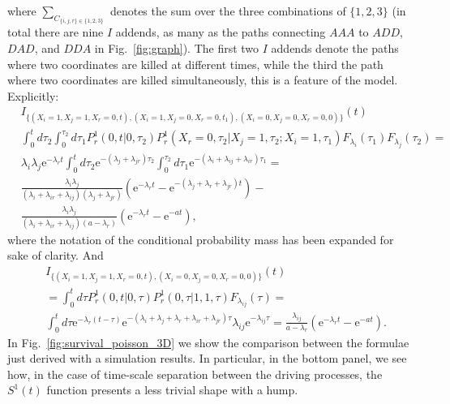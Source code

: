 \documentclass[a4paper,11pt]{amsart}
\theoremstyle{remark}
\newcommand{\ee}[1]{\mathrm{e}^{#1}}
\begin{document}
where $\sum_{C_{\{i,j,r\}\in\{1,2,3\}}}$ denotes the sum over the three combinations of $\{1,2,3\}$ (in total there are nine $I$ addends, as many as the paths connecting $AAA$ to $ADD$, $DAD$, and $DDA$ in Fig.~\ref{fig:graph}). The first two $I$ addends denote the paths where two coordinates are killed at different times, while the third the path where two coordinates are killed simultaneously, this is a feature of the model. Explicitly:
\begin{equation}
  \label{eq:G_2_1}
  \begin{aligned}
    &I_{\{(X_i=1,X_j=1,X_r=0,t),(X_i=1,X_j=0,X_r=0,t_1),(X_i=0,X_j=0,X_r=0,0)\}}(t)\\
    &\int_0^t d\tau_2 \int_0^{\tau_2}d\tau_1 P^1_{r}(0,t|0,\tau_2)P^1_{r}(X_r=0,\tau_2|X_j=1,\tau_2;X_i=1,\tau_1)F_{\lambda_i}(\tau_1)F_{\lambda_j}(\tau_2)=\\
    &\lambda_i\lambda_j\ee{-\lambda_r t}\int_0^t d\tau_2 \ee{-(\lambda_j+\lambda_{jr})\tau_2}\int_0^{\tau_2}d\tau_1\ee{-(\lambda_i+\lambda_{ij}+\lambda_{ir})\tau_1}=\\
    &\frac{\lambda_i\lambda_j}{(\lambda_i+\lambda_{ir}+\lambda_{ij})(\lambda_j+\lambda_{jr})}\left(\ee{-\lambda_r t}-\ee{-(\lambda_j+\lambda_r+\lambda_{jr})t}\right)-\\
    &\frac{\lambda_i\lambda_j}{(\lambda_i+\lambda_{ir}+\lambda_{ij})(a-\lambda_r)}\left(\ee{-\lambda_r t}-\ee{-at}\right),
  \end{aligned}
\end{equation}
where the notation of the conditional probability mass has been expanded for sake of clarity. And
\begin{equation}
  \label{eq:G_2_2}
  \begin{aligned}
    &I_{\{(X_i=1,X_j=1,X_r=0,t),(X_i=0,X_j=0,X_r=0,0)\}}(t)\\
    &=\int_0^t d\tau P^1_{r}(0,t|0,\tau)P^1_{r}(0,\tau|1,1,\tau)F_{\lambda_{ij}}(\tau)=\\
    &\int_0^t d\tau \ee{-\lambda_r(t-\tau)}\ee{-(\lambda_i+\lambda_j+\lambda_{r}+\lambda_{ir}+\lambda_{jr})\tau}\lambda_{ij}\ee{-\lambda_{ij}\tau}=\frac{\lambda_{ij}}{a-\lambda_r}\left(\ee{-\lambda_r t}-\ee{-at}\right).
  \end{aligned}
\end{equation}
In Fig.~\ref{fig:survival_poisson_3D} we show the comparison between the formulae just derived with a simulation results. In particular, in the bottom panel, we see how, in the case of time-scale separation between the driving processes, the $S^1(t)$ function presents a less trivial shape with a hump.
\end{document}
